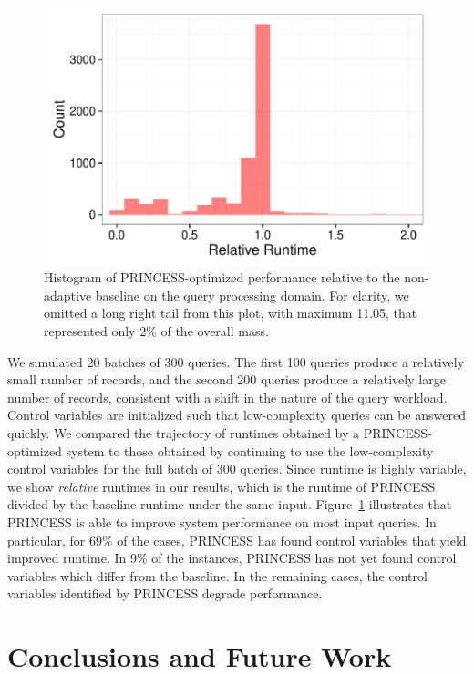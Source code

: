 \documentclass[letterpaper]{article}
\begin{document}
\begin{figure}
	\centering
	\includegraphics[width=0.9\linewidth]{figures/pg-relative-performance.pdf}
	\caption{Histogram of PRINCESS-optimized performance relative to the non-adaptive baseline on the query processing domain.
	For clarity, we omitted a long right tail from this plot, with maximum 11.05, that represented only 2\% of the overall mass.}
	\label{fig:query-processing-results}
\end{figure}

We simulated 20 batches of 300 queries.
The first 100 queries produce a relatively small number of records, and the second 200 queries produce a relatively large number of records,
consistent with a shift in the nature of the query workload.
Control variables are initialized such that low-complexity queries can be answered quickly.
We compared the trajectory of runtimes obtained by a PRINCESS-optimized system to those obtained by continuing to use the low-complexity control variables for the full batch of 300 queries.
Since runtime is highly variable, we show \emph{relative} runtimes in our results, which is the runtime of PRINCESS divided by the baseline runtime under the same input.
Figure~\ref{fig:query-processing-results} illustrates that PRINCESS is able to improve system performance on most input queries.
In particular, for 69\% of the cases, PRINCESS has found control variables that yield improved runtime. In 9\% of the instances, PRINCESS has not yet found control variables which differ from the baseline. In the remaining cases, the control variables identified by PRINCESS degrade performance.

\section{Conclusions and Future Work}
\end{document}
